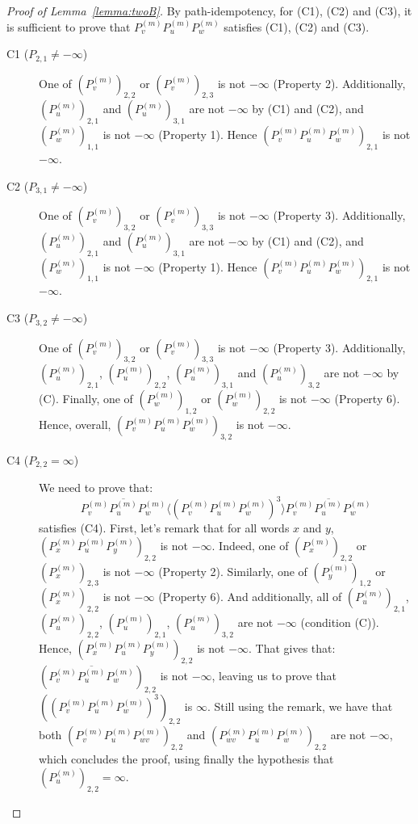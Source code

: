 \documentclass{lmcs}
\theoremstyle{remark}
\theoremstyle{remark}
\begin{document}
\begin{proof}[Proof of Lemma~\ref{lemma:twoB}]
By path-idempotency, for (C1), (C2) and (C3), it is sufficient to prove that $P^{(m)}_v P^{(m)}_u P^{(m)}_w$ satisfies (C1), (C2) and (C3).

\begin{description}
    \item[C1 ($P_{2,1} \neq -\infty$)] One of $(P^{(m)}_v)_{2,2}$ or $(P^{(m)}_v)_{2,3}$ is not $-\infty$ (Property 2). Additionally, $(P^{(m)}_u)_{2,1}$ and $(P^{(m)}_u)_{3,1}$ are not $-\infty$ by (C1) and (C2), and $(P^{(m)}_w)_{1,1}$ is not $-\infty$ (Property 1). Hence $(P^{(m)}_v P^{(m)}_u P^{(m)}_w)_{2,1}$ is not $-\infty$.

\item[C2 ($P_{3,1} \neq -\infty$)]One of $(P^{(m)}_v)_{3,2}$ or $(P^{(m)}_v)_{3,3}$ is not $-\infty$ (Property 3). Additionally, $(P^{(m)}_u)_{2,1}$ and $(P^{(m)}_u)_{3,1}$ are not $-\infty$ by (C1) and (C2), and $(P^{(m)}_w)_{1,1}$ is not $-\infty$ (Property 1). Hence $(P^{(m)}_v P^{(m)}_u P^{(m)}_w)_{2,1}$ is not $-\infty$.

\item[C3 ($P_{3,2} \neq -\infty$)]One of $(P^{(m)}_v)_{3,2}$ or $(P^{(m)}_v)_{3,3}$ is not $-\infty$ (Property 3). Additionally, $(P^{(m)}_u)_{2,1}$, $(P^{(m)}_u)_{2,2}$, $(P^{(m)}_u)_{3,1}$ and $(P^{(m)}_u)_{3,2}$ are not $-\infty$ by (C). Finally, one of $(P^{(m)}_{w})_{1,2}$ or $(P^{(m)}_{w})_{2,2}$ is not $-\infty$ (Property 6). Hence, overall, $(P^{(m)}_v P^{(m)}_u P^{(m)}_w)_{3,2}$ is not $-\infty$.

\item[C4 ($P_{2,2} = \infty$)] We need to prove that:
$$\overline{P^{(m)}_v P^{(m)}_u P^{(m)}_w} \langle (P^{(m)}_v P^{(m)}_u P^{(m)}_w)^3 \rangle \overline{P^{(m)}_v P^{(m)}_u P^{(m)}_w}$$
satisfies (C4).
First, let's remark that for all words $x$ and $y$, $(P^{(m)}_x P^{(m)}_u P^{(m)}_y)_{2,2}$ is not $-\infty$. Indeed, one of $(P^{(m)}_x)_{2,2}$ or $(P^{(m)}_x)_{2,3}$ is not $-\infty$ (Property 2). Similarly, one of $(P^{(m)}_y)_{1,2}$ or $(P^{(m)}_x)_{2,2}$ is not $-\infty$ (Property 6). And additionally, all of $(P^{(m)}_u)_{2,1}$, $(P^{(m)}_u)_{2,2}$,  $(P^{(m)}_u)_{2,1}$,  $(P^{(m)}_u)_{3,2}$ are not $-\infty$ (condition (C)). Hence, $(P^{(m)}_x P^{(m)}_u P^{(m)}_y)_{2,2}$ is not $-\infty$.
That gives that: $(\overline{P^{(m)}_v P^{(m)}_u P^{(m)}_w})_{2,2}$ is not $-\infty$, leaving us to prove that $((P^{(m)}_v P^{(m)}_u P^{(m)}_w)^3)_{2,2}$ is $\infty$. Still using the remark, we have that both $(P^{(m)}_v P^{(m)}_u P^{(m)}_{wv})_{2,2}$ and $(P^{(m)}_{wv} P^{(m)}_u P^{(m)}_w)_{2,2}$ are not $-\infty$, which concludes the proof, using finally the hypothesis that $(P^{(m)}_u)_{2,2} = \infty$. \qedhere
\end{description}
\end{proof}
\end{document}
